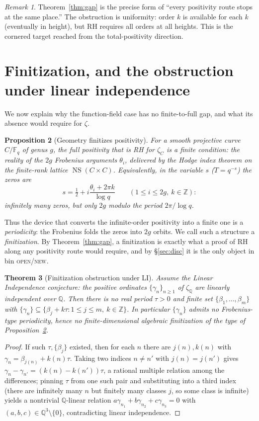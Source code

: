 \documentclass[11pt]{amsart}
\newtheorem{theorem}{Theorem}[section]
\newtheorem{proposition}[theorem]{Proposition}
\theoremstyle{definition}
\theoremstyle{remark}
\newtheorem{remark}[theorem]{Remark}
\DeclareMathOperator{\NS}{NS}
\newcommand{\bbZ}{\mathbb{Z}}
\newcommand{\bbQ}{\mathbb{Q}}
\newcommand{\bbF}{\mathbb{F}}
\begin{document}
\begin{remark}
Theorem~\ref{thm:gap} is the precise form of ``every positivity route stops at
the same place.'' The obstruction is uniformity: order $k$ is available for
each $k$ (eventually in height), but RH requires all orders at all heights.
This is the cornered target reached from the total-positivity direction.
\end{remark}

\section{Finitization, and the obstruction under linear
independence}\label{sec:fin}

We now explain why the function-field case has no finite-to-full gap, and what
its absence would require for $\zeta$.

\begin{proposition}[Geometry finitizes positivity]\label{prop:finit}
For a smooth projective curve $C/\bbF_q$ of genus $g$, the full positivity that
is RH for $\zeta_C$ is a \emph{finite} condition: the reality of the $2g$
Frobenius arguments $\theta_i$, delivered by the Hodge index theorem on the
finite-rank lattice $\NS(C\times C)$. Equivalently, in the variable $s$
($T=q^{-s}$) the zeros are
\[
s=\tfrac12+i\frac{\theta_i+2\pi k}{\log q}\qquad(1\le i\le 2g,\ k\in\bbZ):
\]
infinitely many zeros, but only $2g$ modulo the period $2\pi/\log q$.
\end{proposition}

Thus the device that converts the infinite-order positivity into a finite one
is a \emph{periodicity}: the Frobenius folds the zeros into $2g$ orbits. We
call such a structure a \emph{finitization}. By Theorem~\ref{thm:gap}, a
finitization is exactly what a proof of RH along any positivity route would
require, and by \S\ref{sec:disc} it is the only object in bin
\textsc{open}/\textsc{new}.

\begin{theorem}[Finitization obstruction under LI]\label{thm:LI}
Assume the Linear Independence conjecture: the positive ordinates
$\{\gamma_n\}_{n\ge1}$ of $\zeta_{\bbQ}$ are linearly independent over $\bbQ$.
Then there is no real period $\tau>0$ and finite set $\{\beta_1,\dots,\beta_m\}$
with $\{\gamma_n\}\subseteq\{\beta_j+k\tau: 1\le j\le m,\ k\in\bbZ\}$. In
particular $\{\gamma_n\}$ admits no Frobenius-type periodicity, hence no
finite-dimensional algebraic finitization of the type of
Proposition~\ref{prop:finit}.
\end{theorem}
\begin{proof}
If such $\tau,\{\beta_j\}$ existed, then for each $n$ there are $j(n),k(n)$ with
$\gamma_n=\beta_{j(n)}+k(n)\tau$. Taking two indices $n\ne n'$ with
$j(n)=j(n')$ gives $\gamma_n-\gamma_{n'}=(k(n)-k(n'))\tau$, a rational multiple
relation among the differences; pinning $\tau$ from one such pair and
substituting into a third index (there are infinitely many $n$ but finitely
many classes $j$, so some class is infinite) yields a nontrivial $\bbQ$-linear
relation $a\gamma_{n_1}+b\gamma_{n_2}+c\gamma_{n_3}=0$ with
$(a,b,c)\in\bbQ^3\setminus\{0\}$, contradicting linear independence.
\end{proof}
\end{document}
